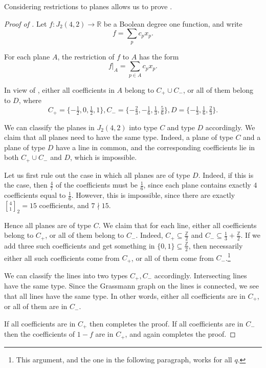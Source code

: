 \documentclass{article}
\theoremstyle{definition}
\providecommand{\sqbinom}[2]{\genfrac{[}{]}{0pt}{}{#1}{#2}}
\providecommand{\RR}{\mathbb{R}}
\begin{document}
Considering restrictions to planes allows us to prove .

\begin{proof}[Proof of ]
Let $f\colon J_2(4,2) \to \RR$ be a Boolean degree one function, and write
\[
 f = \sum_p c_p x_p.
\]

For each plane $A$, the restriction of $f$ to $A$ has the form
\[
 f|_A = \sum_{p \in A} c_p x_p.
\]

In view of , either all coefficients in $A$ belong to $C_+ \cup C_-$, or all of them belong to $D$, where
\[
 C_+ = \{-\tfrac12,0,\tfrac12,1\}, C_- = \{-\tfrac23,-\tfrac16,\tfrac13,\tfrac56\}, D = \{-\tfrac13,\tfrac16,\tfrac23\}.
\]

We can classify the planes in $J_2(4,2)$ into type $C$ and type $D$ accordingly. We claim that all planes need to have the same type. Indeed, a plane of type $C$ and a plane of type $D$ have a line in common, and the corresponding coefficients lie in both $C_+ \cup C_-$ and $D$, which is impossible.

Let us first rule out the case in which all planes are of type $D$. Indeed, if this is the case, then $\frac47$ of the coefficients must be $\frac16$, since each plane contains exactly $4$ coefficients equal to $\frac16$. However, this is impossible, since there are exactly $\sqbinom{4}{1}_2 = 15$ coefficients, and $7 \nmid 15$.

Hence all planes are of type $C$. We claim that for each line, either all coefficients belong to $C_+$, or all of them belong to $C_-$. Indeed, $C_+ \subseteq \frac{\mathbb{Z}}{2}$ and $C_- \subseteq \frac{1}{3} + \frac{\mathbb{Z}}{2}$. If we add three such coefficients and get something in $\{0,1\} \subseteq \frac{\mathbb{Z}}{2}$, then necessarily either all such coefficients come from $C_+$, or all of them come from $C_-$.\footnote{This argument, and the one in the following paragraph, works for all $q$.}

We can classify the lines into two types $C_+,C_-$ accordingly. Intersecting lines have the same type. Since the Grassmann graph on the lines is connected, we see that all lines have the same type. In other words, either all coefficients are in $C_+$, or all of them are in $C_-$.

If all coefficients are in $C_+$ then  completes the proof. If all coefficients are in $C_-$ then the coefficients of $1-f$ are in $C_+$, and again  completes the proof.
\end{proof}
\end{document}
